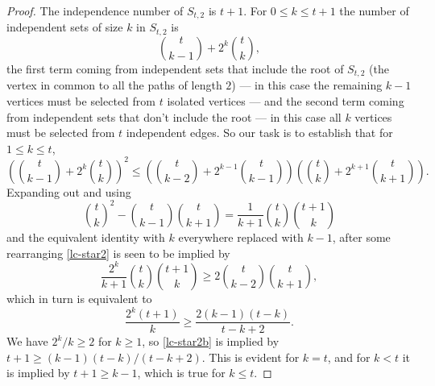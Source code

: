 \documentclass[12pt]{article}
\theoremstyle{definition}
\theoremstyle{definition}
\theoremstyle{definition}
\theoremstyle{definition}
\theoremstyle{definition}
\theoremstyle{definition}
\theoremstyle{definition}
\theoremstyle{definition}
\theoremstyle{remark}
\begin{document}
\begin{proof}
The independence number of $S_{t,2}$ is $t+1$. For $0 \leq k \leq t+1$ the number of independent sets of size $k$ in $S_{t,2}$ is
$$
\binom{t}{k-1} + 2^k\binom{t}{k},
$$
the first term coming from independent sets that include the root of $S_{t,2}$ (the vertex in common to all the paths of length $2$) --- in this case the remaining $k-1$ vertices must be selected from $t$ isolated vertices --- and the second term coming from independent sets that don't include the root --- in this case all $k$ vertices must be selected from $t$ independent edges. So our task is to establish that for $1 \leq k \leq t$,
\begin{equation} \label{lc-star2}
\left(\binom{t}{k-1} + 2^k\binom{t}{k}\right)^2  \leq \left(\binom{t}{k-2} + 2^{k-1}\binom{t}{k-1}\right)\left(\binom{t}{k} + 2^{k+1}\binom{t}{k+1}\right).
\end{equation}
Expanding out and using
$$
\binom{t}{k}^2-\binom{t}{k-1}\binom{t}{k+1} = \frac{1}{k+1}\binom{t}{k}\binom{t+1}{k}
$$
and the equivalent identity with $k$ everywhere replaced with $k-1$, after some rearranging \eqref{lc-star2} is seen to be implied by 
$$
\frac{2^k}{k+1}\binom{t}{k}\binom{t+1}{k} \geq 2\binom{t}{k-2}\binom{t}{k+1},
$$
which in turn is equivalent to
\begin{equation} \label{lc-star2b}
\frac{2^k(t+1)}{k} \geq \frac{2(k-1)(t-k)}{t-k+2}.
\end{equation}
We have $2^k/k \geq 2$ for $k \geq 1$, so \eqref{lc-star2b} is implied by $t+1 \geq (k-1)(t-k)/(t-k+2)$. 
This is evident for $k=t$, and for $k < t$ it is implied by $t+1 \geq k-1$, 
which is true for $k \leq t$.
\end{proof}
\end{document}
